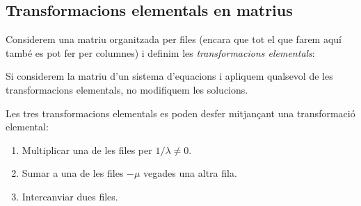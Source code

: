 \subsection{Transformacions elementals en matrius}\label{subsec:trans_el}
Considerem una matriu organitzada per files (encara que tot el que farem aquí també es pot fer per columnes) i definim les \emph{transformacions elementals}:
\begin{center}
\end{center}
\begin{observacio}
	Si considerem la matriu d'un sistema d'equacions i apliquem qualsevol de les transformacions elementals, no modifiquem les solucions.
\end{observacio}
\begin{observacio}
	Les tres transformacions elementals es poden desfer mitjançant una transformació elemental:
	\begin{enumerate}[\bf 1.]
		\item Multiplicar una de les files per $1/\lambda\neq 0$.
		\item Sumar a una de les files $-\mu$ vegades una altra fila.
		\item Intercanviar dues files.
	\end{enumerate} 
\end{observacio}
